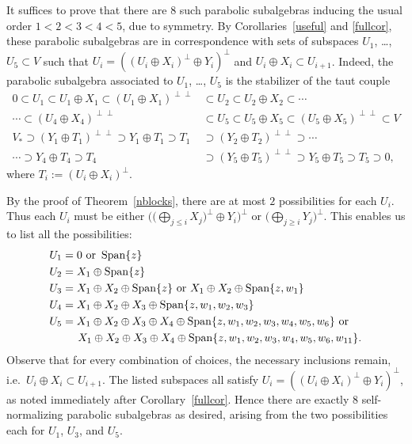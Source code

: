 \documentclass{amsart}
\theoremstyle{definition}
\theoremstyle{remark}
\numberwithin{equation}{section}
\newcommand {\Span}{\operatorname{Span}}
\begin{document}
It suffices to prove that there are $8$ such parabolic subalgebras inducing the usual order $1 < 2 < 3 <4 < 5$, due to symmetry.  By Corollaries~\ref{useful} and \ref{fullcor}, these parabolic subalgebras are in correspondence with sets of subspaces $U_1$, \ldots, $U_5 \subset V$ such that $U_i = ((U_i \oplus X_i)^\perp \oplus Y_i )^\perp$ and $U_i \oplus X_i \subset U_{i+1}$.
Indeed, the parabolic subalgebra associated to $U_1$, \ldots, $U_5$ is the stabilizer of the taut couple
\begin{align*} 
0 \subset U_1 \subset U_1 \oplus X_1  \subset (U_1 \oplus X_1)^{\perp \perp} & \subset  U_2 \subset U_2 \oplus X_2 \subset \cdots \\
\cdots \subset (U_4 \oplus X_4)^{\perp \perp} & \subset U_5 \subset U_5 \oplus X_5 \subset (U_5 \oplus X_5)^{\perp \perp} \subset V \\
V_* \supset (Y_1 \oplus T_1)^{\perp \perp} \supset Y_1 \oplus T_1 \supset  T_1 & \supset (Y_2 \oplus T_2)^{\perp \perp}  \supset \cdots  \\ 
\cdots \supset  Y_4 \oplus T_4 \supset T_4 & \supset (Y_5 \oplus T_5)^{\perp \perp}  \supset Y_5 \oplus T_5 \supset T_5 \supset 0,
\end{align*}
where $T_i := (U_i \oplus X_i)^\perp$.

By the proof of Theorem~\ref{nblocks}, there are at most $2$ possibilities for each $U_i$.  Thus each $U_i$ must be either $\big( \big( \bigoplus_{j \leq i} X_j \big)^\perp \oplus Y_i \big)^\perp$ or $\big( \bigoplus_{j \geq i} Y_j \big)^\perp$.  
This enables us to list all the possibilities:
\begin{align*}
U_1 & =  0 
\textrm{ or } 
\Span\{ z \}   \\
U_2 & = X_1\oplus  \Span\{ z \} \\
U_3   & =  X_1\oplus X_2 \oplus \Span\{ z \} 
\textrm{ or }
X_1\oplus X_2 \oplus \Span\{ z , w_1 \}  \\
 U_4 & =  X_1\oplus X_2 \oplus X_3 \oplus \Span\{ z , w_1 , w_2 , w_3 \} \\
 U_5 & =  X_1\oplus X_2 \oplus X_3 \oplus X_4 \oplus \Span\{ z , w_1 , w_2 , w_3 , w_4 , w_5, w_6 \} \textrm{ or}\\
& \hspace{1em} \hspace{1ex} X_1\oplus X_2 \oplus X_3 \oplus X_4 \oplus \Span\{ z , w_1 , w_2 , w_3 , w_4 , w_5, w_6, w_{11} \}. \end{align*}
Observe that for every combination of choices, the necessary inclusions remain, i.e.\ $U_i \oplus X_i \subset U_{i+1}$.  The listed subspaces all satisfy $U_i = ((U_i \oplus X_i)^\perp \oplus Y_i)^\perp$, as noted immediately after Corollary~\ref{fullcor}.  Hence there are exactly $8$ self-normalizing parabolic subalgebras as desired, arising from the two possibilities each for $U_1$, $U_3$, and $U_5$.
\end{document}
